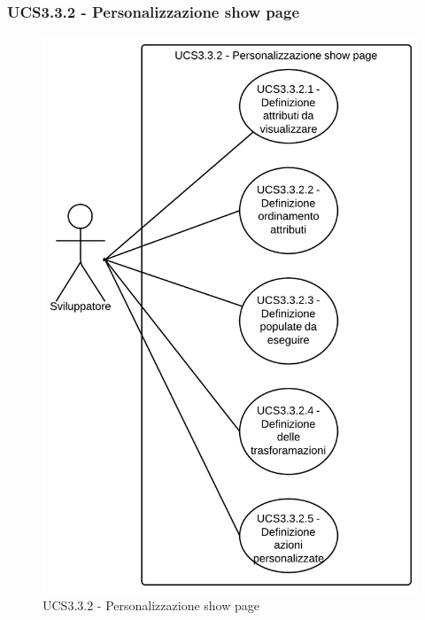 \subsubsection{UCS3.3.2 - Personalizzazione show page} 
    \begin{center}
    \begin{figure}[H]
      \includegraphics[scale=0.16]{UML/UCS3.3.2 - Personalizzazione show page.png}
      \caption{UCS3.3.2 - Personalizzazione show page} 
    \end{figure}
    \end{center}
    
